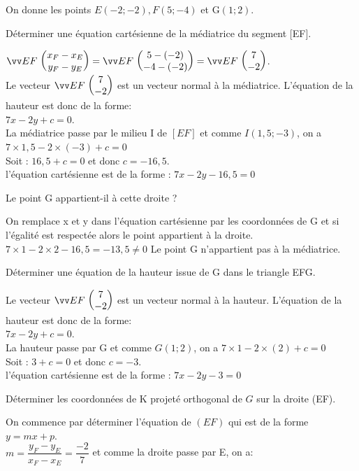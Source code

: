 \documentclass[11pt,a4paper]{article}  %
\begin{document}
\exerciceDS{} %
On donne les points $E(-2 ;-2), F(5 ;-4)$ et $\mathrm{G}(1 ; 2)$.
\begin{enumMet}
	\item Déterminer une équation cartésienne de la médiatrice du segment [EF].
	\begin{corrBox}
		$\Coord{EF}{x_F-x_E}{y_F-y_E}=\Coord{EF}{5-(-2)}{-4-(-2)}=\Coord{EF}{7}{-2}$.\\
		Le vecteur $\Coord{EF}{7}{-2}$ est un vecteur normal à la médiatrice. L'équation de la hauteur est donc de la forme:\\
		$7x-2y+c=0$.\\
		La médiatrice passe par le milieu I de $[EF]$ et comme $I(1,5 ;-3)$, on a $7\times1,5-2\times(-3)+c=0$\\
		Soit : $16,5+c=0$ et donc $c=-16,5$.\\
		l'équation cartésienne est de la forme : $7x-2y-16,5=0$
	\end{corrBox}
	\item Le point $\mathrm{G}$ appartient-il à cette droite ?
	\begin{corrBox}
		On remplace x et y dans l'équation cartésienne par les coordonnées de G et si l'égalité est respectée alors le point appartient à la droite.\\
		$7\times1-2\times2-16,5=-13,5\neq0$
		Le point G n'appartient pas à la médiatrice. 
	\end{corrBox}
	\item Déterminer une équation de la hauteur issue de $\mathrm{G}$ dans le triangle EFG.
	\begin{corrBox}
		Le vecteur $\Coord{EF}{7}{-2}$ est un vecteur normal à la hauteur. L'équation de la hauteur est donc de la forme:\\
		$7x-2y+c=0$.\\
		La hauteur passe par G et comme $G(1 ;2)$, on a $7\times1-2\times(2)+c=0$\\
		Soit : $3+c=0$ et donc $c=-3$.\\
		l'équation cartésienne est de la forme : $7x-2y-3=0$
	\end{corrBox}
	\item Déterminer les coordonnées de K projeté orthogonal de $G$ sur la droite (EF).
	\begin{corrBox}
		On commence par déterminer l'équation de $(EF)$ qui est de la forme $y=mx+p$.\\
		$m=\dfrac{y_F-y_E}{x_F-x_E}=\dfrac{-2}{7}$ et comme la droite passe par E, on a:\\

\end{corrBox}
\end{enumMet}
\end{document}
